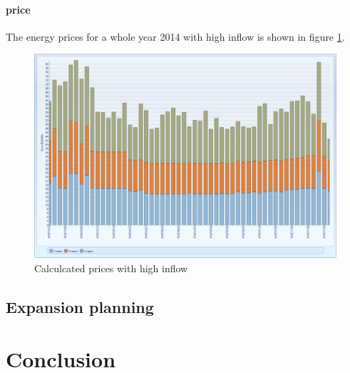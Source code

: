 \documentclass{article}
\begin{document}
\paragraph{price\\}
The energy prices for a whole year 2014 with high inflow is shown in figure \ref{fig:MTpriceswet}.
\begin{figure}[htbp]
\begin{center}
\includegraphics[width=13cm,keepaspectratio=true]{figures/wetcase/MTpriceswet}
\caption{Calculcated prices with high inflow}
\label{fig:MTpriceswet}
\end{center}
\end{figure}

\subsection{Expansion planning}
\newpage
\section{Conclusion}
\end{document}
